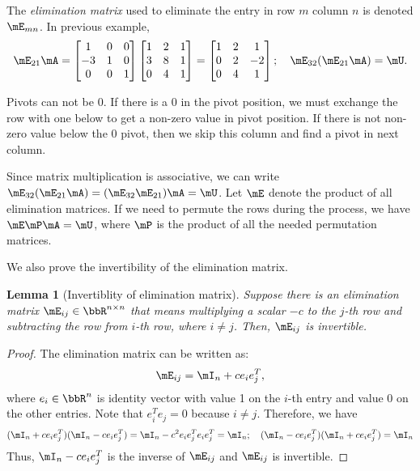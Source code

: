 \documentclass[11pt]{article}
\theoremstyle{plain}
\newtheorem{lem}{Lemma}
\theoremstyle{definition}
\begin{document}
\vspace{.2cm}
The \textit{elimination matrix} used to eliminate the entry in row $m$ column $n$ is denoted $\mE_{mn}$. In previous example, 
\begin{align}
\mE_{21} \mA = 
\begin{bmatrix}
		1 &0&0\\-3 & 1 & 0\\ 0 & 0 & 1 
	\end{bmatrix}
	\begin{bmatrix}
		1 &2&1\\3 & 8 & 1\\ 0 & 4 & 1 
	\end{bmatrix} = \begin{bmatrix}
		1 &2&1\\0 & 2 & -2\\ 0 & 4 & 1 
	\end{bmatrix};\quad \mE_{32} (\mE_{21} \mA) = \mU.
\end{align}

Pivots can not be 0. If there is a 0 in the pivot position, we must exchange the row with one below to get a non-zero value in pivot position. If there is not non-zero value below the 0 pivot, then we skip this column and find a pivot in next column. 

\vspace{.2cm}
Since matrix multiplication is associative, we can write $\mE_{32} (\mE_{21} \mA) = (\mE_{32} \mE_{21} ) \mA = \mU$. Let $\mE$ denote the product of all elimination matrices. If we need to permute the rows during the process, we  have $\mE \mP \mA = \mU$, where $\mP$ is the product of all the needed permutation matrices.

\vspace{.2cm}
We also prove the invertibility of the elimination matrix.
\begin{lem}[Invertiblity of elimination matrix]\label{lem:elim}
 Suppose there is an elimination matrix $\mE_{ij} \in \bbR^{n \times n}$ that means multiplying a scalar $-c$ to the  $j$-th row and subtracting the row from $i$-th row, where $i \neq j$. Then, $\mE_{ij}$ is invertible.
\end{lem}
\begin{proof}
	The elimination matrix can be written as:
	\[ \mE_{ij} = \mI_n + c e_i e_{j}^T, \]
	where $e_i \in \bbR^n$ is identity vector with value 1 on the $i$-th entry and value 0 on the other entries. Note that $e^T_i e_{j} = 0$ because $i \neq j$. Therefore, we have 
	\[ (\mI_n + c e_i e_{j}^T)(\mI_n - c e_i e_{j}^T)  = \mI_n - c^2 e_i e_{j}^T e_i e_{j}^T = \mI_n; \quad (\mI_n - c e_i e_{j}^T)(\mI_n + c e_i e_{j}^T)= \mI_n \]
	Thus, $\mI_n - c e_i e_{j}^T$ is the inverse of $\mE_{ij}$ and $\mE_{ij}$  is invertible.
\end{proof}
\end{document}
